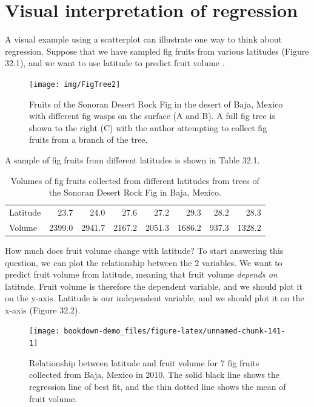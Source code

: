 \documentclass[
  openany]{scrbook}
\begin{document}
\hypertarget{visual-interpretation-of-regression}{%
\section{Visual interpretation of regression}\label{visual-interpretation-of-regression}}

A visual example using a scatterplot can illustrate one way to think about regression.
Suppose that we have sampled fig fruits from various latitudes (Figure 32.1), and we want to use latitude to predict fruit volume \citep{Duthie2016}.

\begin{figure}
\texttt{[image: img/FigTree2]} \caption{Fruits of the Sonoran Desert Rock Fig in the desert of Baja, Mexico with different fig wasps on the surface (A and B). A full fig tree is shown to the right (C) with the author attempting to collect fig fruits from a branch of the tree.}\label{fig:unnamed-chunk-139}
\end{figure}

A sample of fig fruits from different latitudes is shown in Table 32.1.

\begin{longtable}[]{@{}lrrrrrrr@{}}
\caption{\label{tab:unnamed-chunk-140}Volumes of fig fruits collected from different latitudes from trees of the Sonoran Desert Rock Fig in Baja, Mexico.}\tabularnewline
\toprule
\endhead
Latitude & 23.7 & 24.0 & 27.6 & 27.2 & 29.3 & 28.2 & 28.3 \\
Volume & 2399.0 & 2941.7 & 2167.2 & 2051.3 & 1686.2 & 937.3 & 1328.2 \\
\bottomrule
\end{longtable}

How much does fruit volume change with latitude?
To start answering this question, we can plot the relationship between the 2 variables.
We want to predict fruit volume from latitude, meaning that fruit volume \emph{depends on} latitude.
Fruit volume is therefore the dependent variable, and we should plot it on the y-axis.
Latitude is our independent variable, and we should plot it on the x-axis (Figure 32.2).

\begin{figure}
\texttt{[image: bookdown-demo\_files/figure-latex/unnamed-chunk-141-1]} \caption{Relationship between latitude and fruit volume for 7 fig fruits collected from Baja, Mexico in 2010. The solid black line shows the regression line of best fit, and the thin dotted line shows the mean of fruit volume.}\label{fig:unnamed-chunk-141}
\end{figure}
\end{document}
